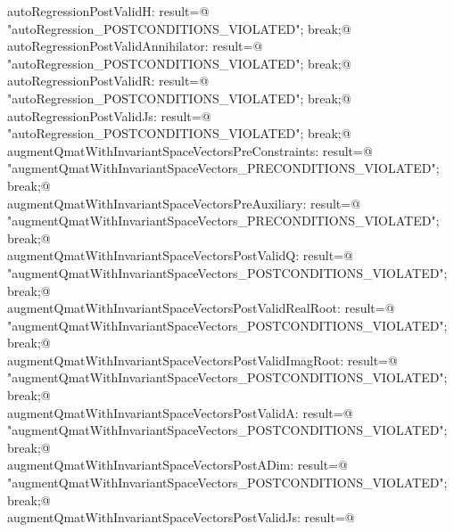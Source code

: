 \documentclass{article}
\begin{document}
\begin{flushleft}
\begin{minipage}{\linewidth}
\begin{list}{}{}
\mbox{}\verb@case  autoRegressionPostValidH: result=@\\
\mbox{}\verb@  "autoRegression_POSTCONDITIONS_VIOLATED"; break;@\\
\mbox{}\verb@case  autoRegressionPostValidAnnihilator: result=@\\
\mbox{}\verb@  "autoRegression_POSTCONDITIONS_VIOLATED"; break;@\\
\mbox{}\verb@case  autoRegressionPostValidR: result=@\\
\mbox{}\verb@  "autoRegression_POSTCONDITIONS_VIOLATED"; break;@\\
\mbox{}\verb@case  autoRegressionPostValidJs: result=@\\
\mbox{}\verb@  "autoRegression_POSTCONDITIONS_VIOLATED"; break;@\\
\mbox{}\verb@case  augmentQmatWithInvariantSpaceVectorsPreConstraints: result=@\\
\mbox{}\verb@  "augmentQmatWithInvariantSpaceVectors_PRECONDITIONS_VIOLATED"; break;@\\
\mbox{}\verb@case  augmentQmatWithInvariantSpaceVectorsPreAuxiliary: result=@\\
\mbox{}\verb@  "augmentQmatWithInvariantSpaceVectors_PRECONDITIONS_VIOLATED"; break;@\\
\mbox{}\verb@case  augmentQmatWithInvariantSpaceVectorsPostValidQ: result=@\\
\mbox{}\verb@  "augmentQmatWithInvariantSpaceVectors_POSTCONDITIONS_VIOLATED"; break;@\\
\mbox{}\verb@case  augmentQmatWithInvariantSpaceVectorsPostValidRealRoot: result=@\\
\mbox{}\verb@  "augmentQmatWithInvariantSpaceVectors_POSTCONDITIONS_VIOLATED"; break;@\\
\mbox{}\verb@case  augmentQmatWithInvariantSpaceVectorsPostValidImagRoot: result=@\\
\mbox{}\verb@  "augmentQmatWithInvariantSpaceVectors_POSTCONDITIONS_VIOLATED"; break;@\\
\mbox{}\verb@case  augmentQmatWithInvariantSpaceVectorsPostValidA: result=@\\
\mbox{}\verb@  "augmentQmatWithInvariantSpaceVectors_POSTCONDITIONS_VIOLATED"; break;@\\
\mbox{}\verb@case  augmentQmatWithInvariantSpaceVectorsPostADim: result=@\\
\mbox{}\verb@  "augmentQmatWithInvariantSpaceVectors_POSTCONDITIONS_VIOLATED"; break;@\\
\mbox{}\verb@case  augmentQmatWithInvariantSpaceVectorsPostValidJs: result=@\\

\end{list}
\end{minipage}
\end{flushleft}
\end{document}

